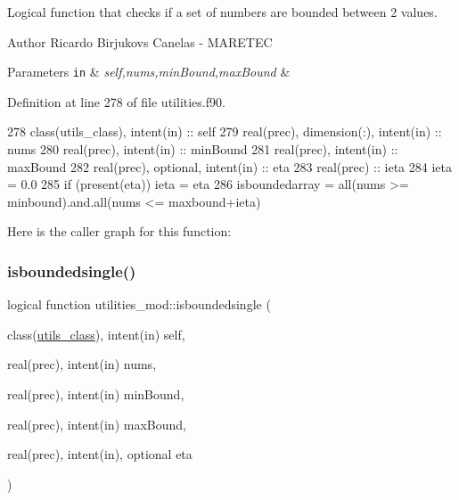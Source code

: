 Logical function that checks if a set of numbers are bounded between 2 values. 

\begin{DoxyAuthor}{Author}
Ricardo Birjukovs Canelas -\/ M\+A\+R\+E\+T\+EC 
\end{DoxyAuthor}

\begin{DoxyParams}[1]{Parameters}
\mbox{\tt in}  & {\em self,nums,min\+Bound,max\+Bound} & \\
\hline
\end{DoxyParams}


Definition at line 278 of file utilities.\+f90.


\begin{DoxyCode}
278     \textcolor{keywordtype}{class}(utils\_class), \textcolor{keywordtype}{intent(in)} :: self
279     \textcolor{keywordtype}{real(prec)}, \textcolor{keywordtype}{dimension(:)}, \textcolor{keywordtype}{intent(in)} :: nums
280     \textcolor{keywordtype}{real(prec)}, \textcolor{keywordtype}{intent(in)} :: minBound
281     \textcolor{keywordtype}{real(prec)}, \textcolor{keywordtype}{intent(in)} :: maxBound
282     \textcolor{keywordtype}{real(prec)}, \textcolor{keywordtype}{optional}, \textcolor{keywordtype}{intent(in)} :: eta
283     \textcolor{keywordtype}{real(prec)} :: ieta
284     ieta = 0.0
285     \textcolor{keywordflow}{if} (\textcolor{keyword}{present}(eta)) ieta = eta
286     isboundedarray = all(nums >= minbound).and.all(nums <= maxbound+ieta)
\end{DoxyCode}
Here is the caller graph for this function\+:
\mbox{\label{namespaceutilities__mod_a258d85bcc477041275bd954667168ea3}} 
\subsubsection{\texorpdfstring{isboundedsingle()}{isboundedsingle()}}
{\footnotesize\ttfamily logical function utilities\+\_\+mod\+::isboundedsingle (\begin{DoxyParamCaption}\item[{class(\mbox{\hyperlink{structutilities__mod_1_1utils__class}{utils\+\_\+class}}), intent(in)}]{self,  }\item[{real(prec), intent(in)}]{nums,  }\item[{real(prec), intent(in)}]{min\+Bound,  }\item[{real(prec), intent(in)}]{max\+Bound,  }\item[{real(prec), intent(in), optional}]{eta }\end{DoxyParamCaption})\hspace{0.3cm}{\ttfamily [private]}}



